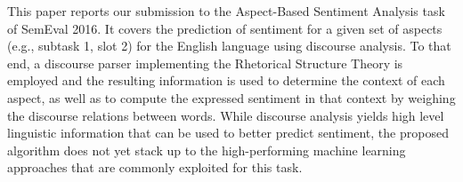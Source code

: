This paper reports our submission to the Aspect-Based Sentiment Analysis task of SemEval 2016. It covers the prediction of sentiment for a given set of aspects (e.g., subtask 1, slot 2) for the English language using discourse analysis. To that end, a discourse parser implementing the Rhetorical Structure Theory is employed and the resulting information is used to determine the context of each aspect, as well as to compute the expressed sentiment in that context by weighing the discourse relations between words. While discourse analysis yields high level linguistic information that can be used to better predict sentiment, the proposed algorithm does not yet stack up to the high-performing machine learning approaches that are commonly exploited for this task.
